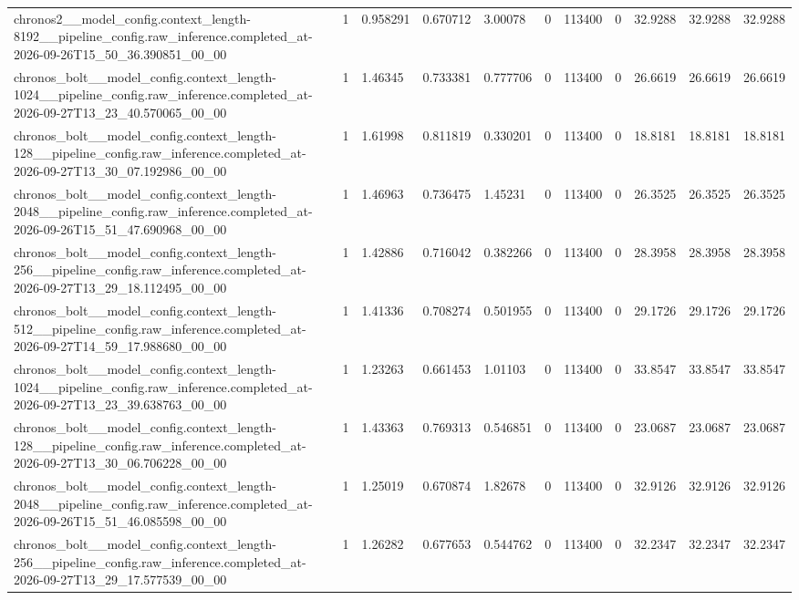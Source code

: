 \begin{tabular}{lllllllllll}
chronos2\_\_model\_config.context\_length-8192\_\_pipeline\_config.raw\_inference.completed\_at-2026-09-26T15\_50\_36.390851\_00\_00 & 1 & 0.958291 & 0.670712 & 3.00078 & 0 & 113400 & 0 & 32.9288 & 32.9288 & 32.9288 \\
chronos\_bolt\_\_model\_config.context\_length-1024\_\_pipeline\_config.raw\_inference.completed\_at-2026-09-27T13\_23\_40.570065\_00\_00 & 1 & 1.46345 & 0.733381 & 0.777706 & 0 & 113400 & 0 & 26.6619 & 26.6619 & 26.6619 \\
chronos\_bolt\_\_model\_config.context\_length-128\_\_pipeline\_config.raw\_inference.completed\_at-2026-09-27T13\_30\_07.192986\_00\_00 & 1 & 1.61998 & 0.811819 & 0.330201 & 0 & 113400 & 0 & 18.8181 & 18.8181 & 18.8181 \\
chronos\_bolt\_\_model\_config.context\_length-2048\_\_pipeline\_config.raw\_inference.completed\_at-2026-09-26T15\_51\_47.690968\_00\_00 & 1 & 1.46963 & 0.736475 & 1.45231 & 0 & 113400 & 0 & 26.3525 & 26.3525 & 26.3525 \\
chronos\_bolt\_\_model\_config.context\_length-256\_\_pipeline\_config.raw\_inference.completed\_at-2026-09-27T13\_29\_18.112495\_00\_00 & 1 & 1.42886 & 0.716042 & 0.382266 & 0 & 113400 & 0 & 28.3958 & 28.3958 & 28.3958 \\
chronos\_bolt\_\_model\_config.context\_length-512\_\_pipeline\_config.raw\_inference.completed\_at-2026-09-27T14\_59\_17.988680\_00\_00 & 1 & 1.41336 & 0.708274 & 0.501955 & 0 & 113400 & 0 & 29.1726 & 29.1726 & 29.1726 \\
chronos\_bolt\_\_model\_config.context\_length-1024\_\_pipeline\_config.raw\_inference.completed\_at-2026-09-27T13\_23\_39.638763\_00\_00 & 1 & 1.23263 & 0.661453 & 1.01103 & 0 & 113400 & 0 & 33.8547 & 33.8547 & 33.8547 \\
chronos\_bolt\_\_model\_config.context\_length-128\_\_pipeline\_config.raw\_inference.completed\_at-2026-09-27T13\_30\_06.706228\_00\_00 & 1 & 1.43363 & 0.769313 & 0.546851 & 0 & 113400 & 0 & 23.0687 & 23.0687 & 23.0687 \\
chronos\_bolt\_\_model\_config.context\_length-2048\_\_pipeline\_config.raw\_inference.completed\_at-2026-09-26T15\_51\_46.085598\_00\_00 & 1 & 1.25019 & 0.670874 & 1.82678 & 0 & 113400 & 0 & 32.9126 & 32.9126 & 32.9126 \\
chronos\_bolt\_\_model\_config.context\_length-256\_\_pipeline\_config.raw\_inference.completed\_at-2026-09-27T13\_29\_17.577539\_00\_00 & 1 & 1.26282 & 0.677653 & 0.544762 & 0 & 113400 & 0 & 32.2347 & 32.2347 & 32.2347 \\

\end{tabular}
